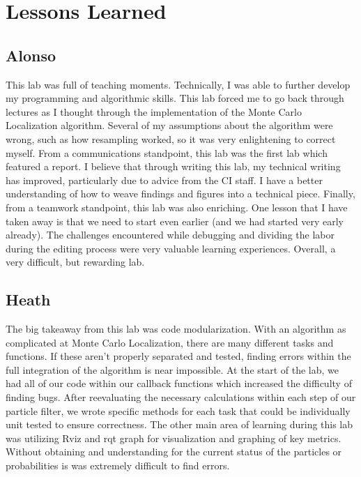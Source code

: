 \documentclass{article}
\begin{document}
\section{Lessons Learned}

\subsection{Alonso}

This lab was full of teaching moments. Technically, I was able to further develop my programming and algorithmic skills. This lab forced me to go back through lectures as I thought through the implementation of the Monte Carlo Localization algorithm. Several of my assumptions about the algorithm were wrong, such as how resampling worked, so it was very enlightening to correct myself. From a communications standpoint, this lab was the first lab which featured a report. I believe that through writing this lab, my technical writing has improved, particularly due to advice from the CI staff. I have a better understanding of how to weave findings and figures into a technical piece. Finally, from a teamwork standpoint, this lab was also enriching. One lesson that I have taken away is that we need to start even earlier (and we had started very early already). The challenges encountered while debugging and dividing the labor during the editing process were very valuable learning experiences. Overall, a very difficult, but rewarding lab.

\subsection{Heath}
The big takeaway from this lab was code modularization. With an algorithm as complicated at Monte Carlo Localization, there are many different tasks and functions. If these aren't properly separated and tested, finding errors within the full integration of the algorithm is near impossible. At the start of the lab, we had all of our code within our callback functions which increased the difficulty of finding bugs. After reevaluating the necessary calculations within each step of our particle filter, we wrote specific methods for each task that could be individually unit tested to ensure correctness. The other main area of learning during this lab was utilizing Rviz and rqt graph for visualization and graphing of key metrics. Without obtaining and understanding for the current status of the particles or probabilities is was extremely difficult to find errors.
\end{document}
